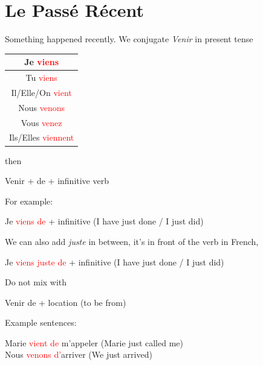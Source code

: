 \documentclass{book}
\begin{document}
\section{Le Passé Récent}
Something happened recently. We conjugate \textit{Venir} in present tense 
\begin{center}
    \begin{tabular}{|c|}
        \hline
        Je \textcolor{red}{viens} \\
        \hline
        Tu \textcolor{red}{viens} \\
        \hline
        Il/Elle/On \textcolor{red}{vient} \\
        \hline
        Nous \textcolor{red}{venons} \\
        \hline
        Vous \textcolor{red}{venez} \\
        \hline
        Ils/Elles \textcolor{red}{viennent} \\
        \hline
    \end{tabular}
\end{center}
then
\begin{center}
    Venir + de + infinitive verb
\end{center}
For example:
\begin{center}
    Je \textcolor{red}{viens de} + infinitive (I have just done / I just did)
\end{center}
We can also add \textit{juste} in between, it's in front of the verb in French,
\begin{center}
    Je \textcolor{red}{viens juste de} + infinitive (I have just done / I just did)
\end{center}
Do not mix with 
\begin{center}
    Venir de + location (to be from)
\end{center}
Example sentences:
\begin{center}
    Marie \textcolor{red}{vient de} m'appeler (Marie just called me) \\
    Nous \textcolor{red}{venons d'}arriver (We just arrived)
\end{center}
\end{document}
